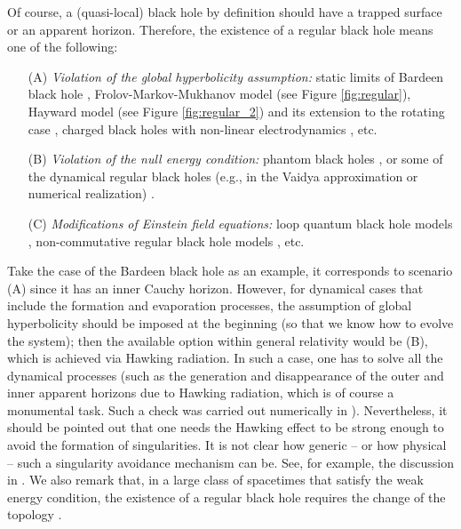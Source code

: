 \documentclass[12pt]{article}
\newcommand{\2}{$^2$}
\newcommand{\3}{$^3$}
\newcommand{\4}{$_4$}
\newcommand{\5}{$_5$}
\begin{document}
Of course, a (quasi-local) black hole by definition should have a trapped surface or an apparent horizon. Therefore, the existence of a regular black hole means one of the following:
\begin{itemize}
\item[(A)] {\it Violation of the global hyperbolicity assumption:} static limits of Bardeen black hole \cite{Bardeen}, Frolov-Markov-Mukhanov model (see Figure \ref{fig:regular})\cite{Frolov:1988vj}, Hayward model \cite{Hayward:2005gi} (see Figure \ref{fig:regular_2}) and its extension to the rotating case \cite{1410.4043}, charged black holes with non-linear electrodynamics \cite{AyonBeato:1999rg}, etc.
\item[(B)] {\it Violation of the null energy condition:} phantom black holes \cite{Bronnikov:2005gm}, or some of the dynamical regular black holes (e.g., in the Vaidya approximation or numerical realization) \cite{Hayward:2005gi}.
\item[(C)] {\it Modifications of Einstein field equations:} loop quantum black hole models \cite{Modesto:2005zm}, non-commutative regular black hole models \cite{Nicolini:2005vd}, etc.  
\end{itemize}
Take the case of the Bardeen black hole as an example, it corresponds to scenario (A) since it has an inner Cauchy horizon. However, for dynamical cases that include the formation and evaporation processes, the assumption of global hyperbolicity should be imposed at the beginning (so that we know how to evolve the system); then the available option within general relativity would be (B), which is achieved via Hawking radiation. In such a case, one has to solve all the dynamical processes (such as the generation and disappearance of the outer and inner apparent horizons due to Hawking radiation, which is of course a monumental task. Such a check was carried out numerically in \cite{Hwang:2012nn}). {\color{black}Nevertheless, it should be pointed out that one needs the Hawking effect to be strong enough to avoid the formation of singularities. It is not clear how generic -- or how physical -- such a singularity avoidance mechanism can be. See, for example, the discussion in \cite{roman}. We also remark that, in a large class of spacetimes that satisfy the weak energy condition, the existence of a regular black hole requires the change of the topology \cite{9612057}.}
\end{document}
